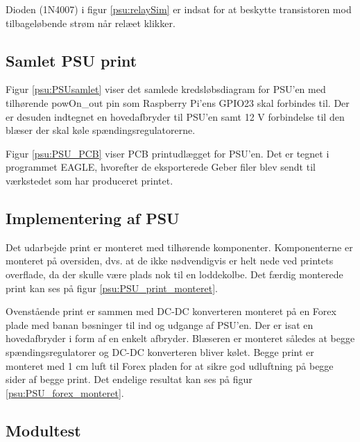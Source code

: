 Dioden (1N4007) i figur \ref{psu:relaySim} er indsat for at beskytte transistoren mod tilbageløbende strøm når relæet klikker. 


\subsection{Samlet PSU print}


Figur \ref{psu:PSUsamlet} viser det samlede kredsløbsdiagram for PSU'en med tilhørende powOn\_out pin som Raspberry Pi'ens GPIO23 skal forbindes til. Der er desuden indtegnet en hovedafbryder til PSU'en samt 12 V forbindelse til den blæser der skal køle spændingsregulatorerne.

Figur \ref{psu:PSU_PCB} viser PCB printudlægget for PSU'en. Det er tegnet i programmet EAGLE, hvorefter de eksporterede Geber filer blev sendt til værkstedet som har produceret printet. 


\subsection{Implementering af PSU}

Det udarbejde print er monteret med tilhørende komponenter. Komponenterne er monteret på oversiden, dvs. at de  ikke nødvendigvis er helt nede ved printets overflade, da der skulle være plads nok til en loddekolbe. Det færdig monterede print kan ses på figur \ref{psu:PSU_print_monteret}.


Ovenstående print er sammen med DC-DC konverteren monteret på en Forex plade med banan bøsninger til ind og udgange af PSU'en. Der er isat en hovedafbryder i form af en enkelt afbryder. Blæseren er monteret således at begge spændingsregulatorer og DC-DC konverteren bliver kølet. Begge print er monteret med 1 cm luft til Forex pladen for at sikre god udluftning på begge sider af begge print. Det endelige resultat kan ses på figur  \ref{psu:PSU_forex_monteret}.


\subsection{Modultest}

